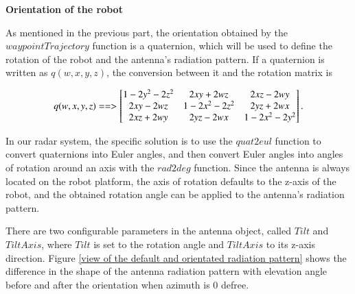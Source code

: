 \documentclass[12pt,DIV14,BCOR12mm,a4paper,footinclude=false,headinclude,parskip=half-,twoside,openright,cleardoublepage=empty,toc=index,bibliography=totoc,listof=totoc]{scrreprt}
\numberwithin{equation}{chapter}
\begin{document}
\begin{spacing}{1.5}
\textbf{\large{Orientation of the robot}}
\end{spacing}

As mentioned in the previous part, the orientation obtained by the $waypointTrajectory$ function is a quaternion, which will be used to define the rotation of the robot and the antenna's radiation pattern. If a quaternion is written as $q(w, x, y, z)$, the conversion \cite{quaternion_transform} between it and the rotation matrix is

\begin{equation}
    \centering
    q(w, x, y, z) ==> \begin{bmatrix}
    1 - 2y^2 - 2z^2 & 2xy + 2wz & 2xz - 2wy \\
    2xy - 2wz & 1 - 2x^2 - 2z^2 & 2yz + 2wx \\
    2xz + 2wy & 2yz - 2wx & 1 - 2x^2 - 2y^2
    \end{bmatrix}.
\end{equation}

In our radar system, the specific solution is to use the $quat2eul$ function to convert quaternions into Euler angles, and then convert Euler angles into angles of rotation around an axis with the $rad2deg$ function. Since the antenna is always located on the robot platform, the axis of rotation defaults to the z-axis of the robot, and the obtained rotation angle can be applied to the antenna's radiation pattern.

There are two configurable parameters in the antenna object, called $Tilt$ and $TiltAxis$, where $Tilt$ is set to the rotation angle and $TiltAxis$ to its z-axis direction. Figure \ref{view of the default and orientated radiation pattern} shows the difference in the shape of the antenna radiation pattern with elevation angle before and after the orientation when azimuth is 0 defree.
\end{document}
